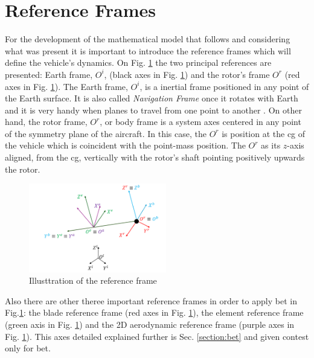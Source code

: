 \section{Reference Frames}

For the development of the mathematical model that follows and considering what was present it is important to introduce the reference frames which will define the vehicle’s dynamics. On Fig. \ref{fig:reference_frames} the two principal references are presented: Earth frame, $O^i$, (black axes in Fig. \ref{fig:reference_frames}) and the rotor’s frame $O^r$ (red axes in Fig. \ref{fig:reference_frames}). The Earth frame, $O^i$, is a inertial frame positioned in any point of the Earth surface. It is also called  \textit{Navigation Frame} \cite{soler_fundamentals_2014} once it rotates with Earth and it is very handy when planes to travel from one point to another \cite{soler_fundamentals_2014}. On other hand, the rotor frame, $O^r$, or body frame \cite{soler_fundamentals_2014} is a system axes centered in any point of the symmetry plane of the aircraft. In this case, the $O^r$ is position at the \gls{cg} of the vehicle which is coincident with the point-mass position. The $O^r$ as its $z$-axis aligned, from the \gls{cg}, vertically with the rotor's shaft pointing positively upwards the rotor.

\begin{figure}[!htb]
    \centering
    \includegraphics[width=6cm]{Figures/background/reference_frames.png}
    \caption{Illusttration of the reference frame}
    \label{fig:reference_frames}
\end{figure}

Also there are other theree important reference frames in order to apply \gls{bet} in Fig.\ref{fig:reference_frames}: the blade reference frame (red axes in Fig. \ref{fig:reference_frames}), the element reference frame (green axis in Fig. \ref{fig:reference_frames}) and the 2D aerodynamic reference frame (purple axes in Fig. \ref{fig:reference_frames}). This axes detailed explained further is Sec. \ref{section:bet} and given contest only for \gls{bet}.

